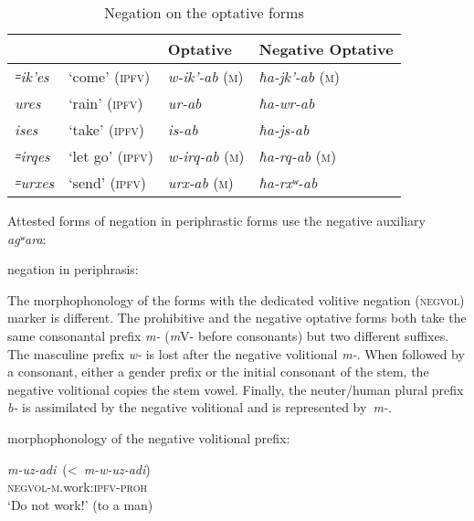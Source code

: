 \documentclass[output=paper]{langsci/langscibook}
\begin{document}
\begin{table}
\caption{Negation on the optative forms}

\begin{tabular}{@{}llll@{}}
\toprule
&& Optative & Negative Optative\tabularnewline \midrule
\emph{꞊ik'es} & `come' (\textsc{ipfv}) & \emph{w-ik'-ab} (\textsc{m}) & \emph{ħa-jk'-ab} (\textsc{m})\tabularnewline
\emph{ures} & `rain' (\textsc{ipfv}) & \emph{ur-ab} & \emph{ħa-wr-ab}\tabularnewline 
\emph{ises} & `take' (\textsc{ipfv}) & \emph{is-ab} & \emph{ħa-js-ab}\tabularnewline
\emph{꞊irqes} & `let go' (\textsc{ipfv}) & \emph{w-irq-ab} (\textsc{m}) & \emph{ħa-rq-ab} (\textsc{m})\tabularnewline
\emph{꞊urxes} & `send' (\textsc{ipfv}) & \emph{urx-ab} (\textsc{m}) & \emph{ħa-rxʷ-ab}\tabularnewline
\bottomrule
\end{tabular}
\end{table}

Attested forms of negation in periphrastic forms use the negative auxiliary
\emph{agʷara}:

\ea %
negation in periphrasis:

\ea %
%
\exsameline %
\z
\z


The morphophonology of the forms with the dedicated volitive negation
(\textsc{negvol}) marker is different. The prohibitive and the negative optative
forms both take the same consonantal prefix \emph{m-} (\emph{m}V- before
consonants) but two different suffixes. The masculine prefix \emph{w-}
is lost after the negative volitional \emph{m-}. When followed by
a consonant, either a gender prefix or the initial
consonant of the stem,
the negative volitional copies the stem vowel. Finally, the neuter/human
plural prefix \emph{b-} is assimilated by the negative volitional and is
represented by~\emph{m-}.


\ea \label{ex:4:13} %
morphophonology of the negative volitional prefix:

\ea %
\gll \emph{m-uz-adi}~(\textless{}~\emph{m-w-uz-adi})\\
\textsc{negvol}-\textsc{m}.work:\textsc{ipfv}-\textsc{proh}\\
\glt `Do not work!' (to a man)
\end{document}
